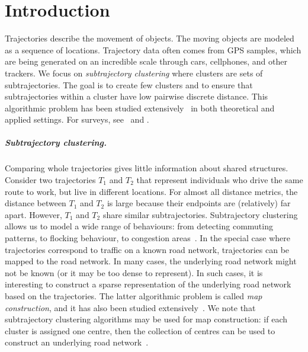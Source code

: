 \documentclass[english, thm-restate]{lipics-v2021}
\begin{document}
\section{Introduction}

Trajectories describe the movement of objects.
The moving objects are modeled as a sequence of locations.
Trajectory data often comes from GPS samples, which are being generated on an incredible scale through cars, cellphones, and other trackers.  
We focus on \emph{subtrajectory clustering} where clusters are sets of subtrajectories. The goal is to create few clusters and to ensure that subtrajectories within a cluster have low pairwise discrete \frechet distance. This algorithmic problem has been studied extensively~\cite{agarwal2018subtrajectory, bruning2022faster, buchin2020improved, buchin2011detecting,  buchin2013median, chen2013pathlet, conradi2023finding, gaffney1999trajectory, gudmundsson2012gpu, gudmundsson2022cubic, gudmundsson2012motifs, hung2015clustering, lee2007trajectory, sung2012trajectory} in both theoretical and applied settings. 
For surveys, see~\cite{bian2018survey} and \cite{machado2024survey}.

\subparagraph{Subtrajectory clustering. } 
Comparing whole trajectories gives little information about shared structures. Consider two trajectories $T_1$ and $T_2$ that represent individuals who drive the same route to work, but live in different locations. 
For almost all distance metrics, the distance between $T_1$ and $T_2$ is large because their endpoints are (relatively) far apart. However, $T_1$ and $T_2$ share similar subtrajectories. 
Subtrajectory clustering allows us to model a wide range of behaviours: from detecting commuting patterns, to flocking behaviour, to congestion areas~\cite{buchin2011detecting}. 
In the special case where trajectories correspond to traffic on a known road network,
trajectories can be mapped to the road network. In many cases, the underlying road network might not be known (or it may be too dense to represent).
In such cases, it is interesting to construct a sparse representation of the underlying road network based on the trajectories.
The latter algorithmic problem is called \emph{map construction}, and it has also been studied extensively~\cite{
ahmed2015comparison, biagioni2012map, ahmed2012constructing,cao2009gps, davies2006scalable,karagiorgou2012vehicle, karagiorgou2013segmentation}.
We note that subtrajectory clustering algorithms may be used for map construction: if each cluster is assigned one centre, then the collection of centres can be used to construct an underlying road network~\cite{buchin2017clustering, buchin2020improved}.
\end{document}
